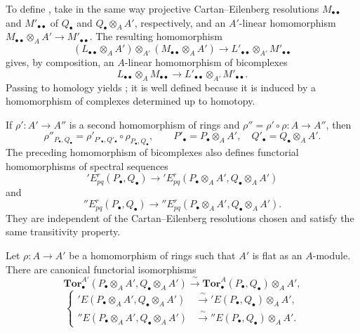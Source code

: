 \begin{env}[6.3.8]
To define , take in the same way projective
Cartan--Eilenberg resolutions $M_{\bullet\bullet}$ and
$M'_{\bullet\bullet}$ of $Q_\bullet$ and
$Q_\bullet\otimes_AA'$, respectively, and an $A'$-linear
homomorphism
$M_{\bullet\bullet}\otimes_AA'\longrightarrow M'_{\bullet\bullet}$.
The resulting homomorphism
\[
  (L_{\bullet\bullet}\otimes_AA')
  \otimes_{A'}
  (M_{\bullet\bullet}\otimes_AA')
  \longrightarrow
  L'_{\bullet\bullet}\otimes_{A'}M'_{\bullet\bullet}
\]
gives, by composition, an $A$-linear homomorphism of bicomplexes
\[
  L_{\bullet\bullet}\otimes_AM_{\bullet\bullet}
  \longrightarrow
  L'_{\bullet\bullet}\otimes_{A'}M'_{\bullet\bullet}.
\]
Passing to homology yields ; it is well defined
because it is induced by a homomorphism of complexes determined up
to homotopy.

If $\rho':A'\longrightarrow A''$ is a second homomorphism of rings
and $\rho''=\rho'\circ\rho:A\longrightarrow A''$, then
\[
  \rho''_{P_\bullet,Q_\bullet}
  =
  \rho'_{P'_\bullet,Q'_\bullet}
  \circ
  \rho_{P_\bullet,Q_\bullet},
  \qquad
  P'_\bullet=P_\bullet\otimes_AA',
  \quad
  Q'_\bullet=Q_\bullet\otimes_AA'.
\]
The preceding homomorphism of bicomplexes also defines functorial
homomorphisms of spectral sequences
\[
  'E_{pq}^r(P_\bullet,Q_\bullet)
  \longrightarrow
  'E_{pq}^r(P_\bullet\otimes_AA',Q_\bullet\otimes_AA')
\]
and
\[
  ''E_{pq}^r(P_\bullet,Q_\bullet)
  \longrightarrow
  ''E_{pq}^r(P_\bullet\otimes_AA',Q_\bullet\otimes_AA').
\]
They are independent of the Cartan--Eilenberg resolutions chosen
and satisfy the same transitivity property.
\end{env}

\begin{proposition}[6.3.9]
\label{III.6.3.9}
Let $\rho:A\longrightarrow A'$ be a homomorphism of rings such that
$A'$ is flat as an $A$-module.  There are canonical functorial
isomorphisms
\[
  \mathbf{Tor}_\bullet^{A'}
  (P_\bullet\otimes_AA',Q_\bullet\otimes_AA')
  \xrightarrow{\ \sim\ }
  \mathbf{Tor}_\bullet^A(P_\bullet,Q_\bullet)\otimes_AA',
  \tag{6.3.9.1}\label{III.6.3.9.1}
\]
\[
  \left\{
  \begin{aligned}
  'E(P_\bullet\otimes_AA',Q_\bullet\otimes_AA')
    &\xrightarrow{\ \sim\ }
      'E(P_\bullet,Q_\bullet)\otimes_AA',\\
  ''E(P_\bullet\otimes_AA',Q_\bullet\otimes_AA')
    &\xrightarrow{\ \sim\ }
      ''E(P_\bullet,Q_\bullet)\otimes_AA'.
  \end{aligned}
  \right.
  \tag{6.3.9.2}\label{III.6.3.9.2}
\]
\end{proposition}

